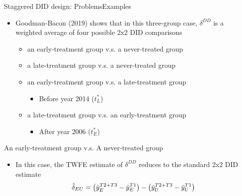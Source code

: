 \documentclass[dvipsnames,hyperref={pdfpagelabels=false}]{beamer}
\begin{document}
\begin{frame}{Staggered DID design: Problems}{Examples}
	\begin{itemize}
		\item  Goodman-Bacon (2019) shows that in this three-group case, $\delta^{DD}$ is a weighted average of four possible 2x2 DID comparisons
		\vspace{0.2cm}
		\begin{itemize}
			\item[1] an early-treatment group v.s. a never-treated group 
			\vspace{0.2cm}
			\item[2] a late-treatment group v.s. a never-treated group 
			\vspace{0.2cm}
			\item[3] an early-treatment group v.s. a late-treatment group 
							\vspace{0.2cm}
					\begin{itemize}
			\item Before year 2014 ($t^{*}_{L}$) 
					\end{itemize}
				\vspace{0.2cm}
			\item[4] a late-treatment group v.s. an early-treatment group 
				\vspace{0.2cm}
			\begin{itemize}
			\item After year 2006 ($t^{*}_{E}$) 
					\end{itemize}
		\end{itemize}
	
		
	\end{itemize}
\end{frame}






\begin{frame}{An early-treatment group v.s. A never-treated group }{}
	\begin{itemize}
		\item  In this case,
		the TWFE estimate of $\delta^{DD}$ reduces to the standard 2x2 DID estimate
		\vspace{0.2cm}
	\begin{equation*}
		\hat{\delta}_{EU}=\left( \Bar{y}^{T2+T3}_{E} - \Bar{y}^{T1}_{E}\right) - \left( \Bar{y}^{T2+T3}_{U} - \Bar{y}^{T1}_{U}\right)
	\end{equation*}
		
		
	\end{itemize}
\end{frame}
\end{document}
